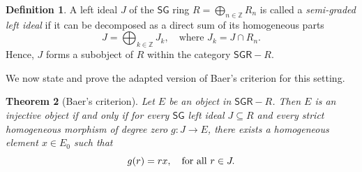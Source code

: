 \documentclass[reqno]{amsart}
\newtheorem{theorem}{Theorem}[section]
\theoremstyle{definition}
\newtheorem{definition}[theorem]{Definition}
\theoremstyle{remark}
\numberwithin{equation}{section}
\begin{document}
\begin{definition}\label{def.SGideals}
A left ideal $J$ of the $\mathsf{SG}$ ring $R = \bigoplus_{n \in \mathbb{Z}} R_n$ is called a {\em semi-graded left ideal} if it can be decomposed as a direct sum of its homogeneous parts
\[
J = \bigoplus_{k \in \mathbb{Z}} J_k, \quad \text{where } J_k = J \cap R_n.
\]
Hence, $J$ forms a subobject of $R$ within the category $\mathsf{SGR}-R$.
\end{definition}

We now state and prove the adapted version of Baer's  criterion for this setting. 

\begin{theorem}[Baer's criterion]\label{thm.BaersCriterion}
Let $E$ be an object in $\mathsf{SGR}-R$. Then $E$ is an injective object if and only if for every $\mathsf{SG}$ left ideal $J \subseteq R$ and every strict homogeneous morphism of degree zero $g: J \to E$, there exists a homogeneous element $x \in E_0$ such that 
\[
g(r) = r x, \quad {\rm for\ all } \ r \in J.
\]
\end{theorem}
\end{document}
